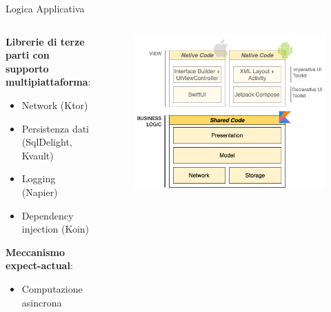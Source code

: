 \begin{frame}{Logica Applicativa}
    \begin{columns}[onlytextwidth]
        \begin{column}{0.4\textwidth}
            \textbf{Librerie di terze parti con supporto multipiattaforma}:
            \begin{itemize}
                \item Network (Ktor)
                \item Persistenza dati (SqlDelight, Kvault)
                \item Logging (Napier)
                \item Dependency injection (Koin)
            \end{itemize}
            \vspace{5mm}
            \textbf{Meccanismo expect-actual}:
            \begin{itemize}
                \item Computazione asincrona
            \end{itemize}
        \end{column}
        \begin{column}{0.6\textwidth}
             \begin{figure}[H]
                \includegraphics[width=1\textwidth]{img/stack_kmm_shared.png}
            \end{figure}
        \end{column}
    \end{columns}
\end{frame}

